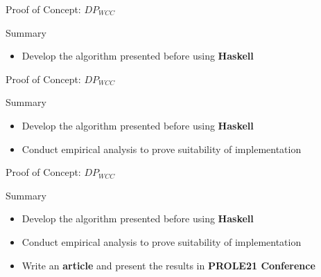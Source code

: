 \begin{frame}[fragile]{Proof of Concept: $DP_{WCC}$}
  \begin{block}{Summary}
  \begin{itemize}
    \item Develop the algorithm presented before using \textbf{Haskell}
  \end{itemize}
  \end{block}
\end{frame}

\begin{frame}[fragile]{Proof of Concept: $DP_{WCC}$}
  \begin{block}{Summary}
  \begin{itemize}
    \item {\color{light}Develop the algorithm presented before using \textbf{Haskell}}
    \item Conduct empirical analysis to prove suitability of implementation
  \end{itemize}
  \end{block}
\end{frame}

\begin{frame}[fragile]{Proof of Concept: $DP_{WCC}$}
  \begin{block}{Summary}
  \begin{itemize}
    \item {\color{light}Develop the algorithm presented before using \textbf{Haskell}}
    \item {\color{light}Conduct empirical analysis to prove suitability of implementation}
    \item Write an \textbf{article} and present the results in \textbf{PROLE21 Conference}~\cite{prole:2021:017}
  \end{itemize}
  \end{block}
\end{frame}

